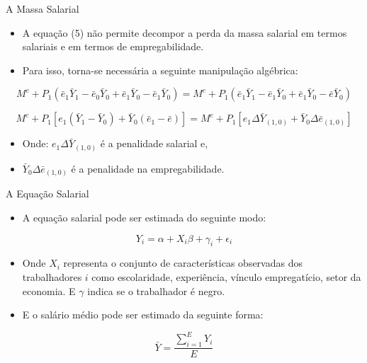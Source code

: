 \documentclass[10pt, xcolor=x11names,compress]{beamer}
\begin{document}
	\begin{frame}{A Massa Salarial}
	\begin{itemize}
		\item A equação (5) não permite decompor a perda da massa salarial em termos salariais e em termos de empregabilidade.
		\item 	Para isso, torna-se necessária a seguinte manipulação algébrica: 
	\end{itemize}
		\begin{equation}
		M^{c} + P_{1}(\bar{e}_{1}\bar{Y}_{1} - \bar{e}_{0}\bar{Y}_{0} + \bar{e}_{1}\bar{Y}_{0} - \bar{e}_{1}\bar{Y}_{0}) = M^{c} + P_{1}(\bar{e}_{1}\bar{Y}_{1} - \bar{e}_{1}\bar{Y}_{0} + \bar{e}_{1}\bar{Y}_{0} - \bar{e}\bar{Y}_{0})
	\end{equation}
	
	\begin{equation}
		M^{c} + P_{1}[e_{1}(\bar{Y}_{1} - \bar{Y}_{0}) + \bar{Y}_{0}(\bar{e}_{1} - \bar{e} )] =  M^{c} + P_{1}[e_{1}\Delta \bar{Y}_{(1,0)} + \bar{Y}_{0}\Delta \bar{e}_{(1,0)}]
	\end{equation}
	\begin{itemize}
		\item Onde: $e_{1}\Delta \bar{Y}_{(1,0)}$ é a penalidade salarial e,
		\item 	$\bar{Y}_{0}\Delta \bar{e}_{(1,0)}$ é a penalidade na empregabilidade.
		\end{itemize}
	\end{frame}	
		
	\begin{frame}{A Equação Salarial}
		\begin{itemize}
			\item A equação salarial pode ser estimada do seguinte modo:
		\end{itemize}
			\begin{equation}
			{Y}_{i} = \alpha + X_{i}\beta +  \gamma_{i} + \epsilon_{i}
		\end{equation}	
		\begin{itemize}
			\item Onde $X_{i}$ representa o conjunto de características observadas dos trabalhadores $i$ como escolaridade, experiência, vínculo empregatício, setor da economia. E $\gamma$ indica se o trabalhador é negro.
			\item E o salário médio pode ser estimado da seguinte forma:
		\end{itemize}
			\begin{equation}
			\bar{Y} =  \frac{\sum_{i=1}^{E}{Y}_{i}}{E}
		\end{equation}	
		\end{frame}
		
\end{document}
